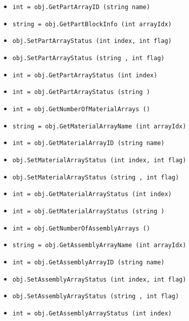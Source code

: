 \begin{itemize}
\item  \verb|int = obj.GetPartArrayID (string name)|

\item  \verb|string = obj.GetPartBlockInfo (int arrayIdx)|

\item  \verb|obj.SetPartArrayStatus (int index, int flag)|

\item  \verb|obj.SetPartArrayStatus (string , int flag)|

\item  \verb|int = obj.GetPartArrayStatus (int index)|

\item  \verb|int = obj.GetPartArrayStatus (string )|

\item  \verb|int = obj.GetNumberOfMaterialArrays ()|

\item  \verb|string = obj.GetMaterialArrayName (int arrayIdx)|

\item  \verb|int = obj.GetMaterialArrayID (string name)|

\item  \verb|obj.SetMaterialArrayStatus (int index, int flag)|

\item  \verb|obj.SetMaterialArrayStatus (string , int flag)|

\item  \verb|int = obj.GetMaterialArrayStatus (int index)|

\item  \verb|int = obj.GetMaterialArrayStatus (string )|

\item  \verb|int = obj.GetNumberOfAssemblyArrays ()|

\item  \verb|string = obj.GetAssemblyArrayName (int arrayIdx)|

\item  \verb|int = obj.GetAssemblyArrayID (string name)|

\item  \verb|obj.SetAssemblyArrayStatus (int index, int flag)|

\item  \verb|obj.SetAssemblyArrayStatus (string , int flag)|

\item  \verb|int = obj.GetAssemblyArrayStatus (int index)|


\end{itemize}
